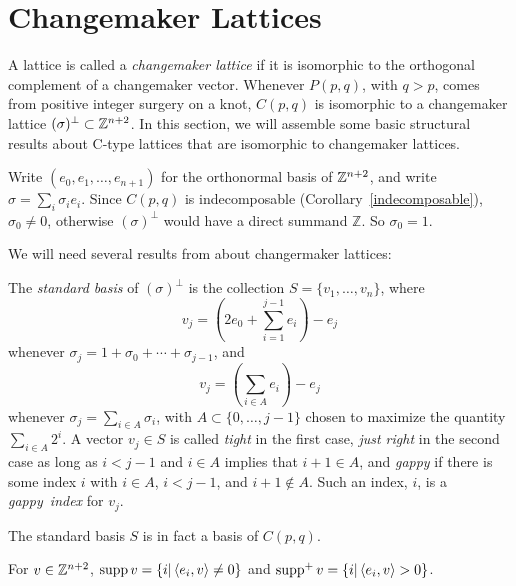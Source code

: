 \section{Changemaker Lattices}\label{sec:ChangemakerLattices}


A lattice is called a {\it changemaker lattice} if it is isomorphic to the orthogonal complement of a changemaker vector. Whenever $P(p, q)$, with $q>p$, comes from positive integer surgery on a knot, $C(p,q)$ is isomorphic to a changemaker lattice $(\sigma)^\perp\subset \mathbb{Z}^{n+2}$. 
In this section, we will assemble some basic structural results about C-type lattices that are isomorphic to changemaker lattices.

Write $(e_0,e_1, \dots, e_{n+1})$ for the orthonormal basis of $\mathbb{Z}^{n+2}$, and write $\sigma = \sum_i \sigma_i e_i$. 
Since $C(p,q)$ is indecomposable (Corollary~\ref{indecomposable}), $\sigma_0\ne0$, otherwise $(\sigma)^\perp$ would have a direct summand $\mathbb Z$. So $\sigma_0=1$.

We will need several results from \cite[Section~3]{greene:LSRP} about changermaker lattices:

\begin{definition}\label{stbasis}
The {\it standard basis} of $(\sigma)^\perp$ is the collection $S = \{v_1, \dots, v_{n}\}$, where
\begin{equation*}
    v_j = \left(2e_0 + \sum_{i = 1}^{j - 1} e_i\right) - e_j
\end{equation*}
whenever $\sigma_j = 1 + \sigma_0 + \cdots + \sigma_{j-1}$, and
\begin{equation*}
    v_j = \left(\sum_{i \in A} e_i\right) - e_j
\end{equation*}
whenever $\sigma_j = \sum_{i \in A} \sigma_i$, with $A \subset \{0, \dots, j-1\}$ chosen to maximize the quantity $\sum_{i \in A} 2^i$.  A vector $v_j \in S$ is called \emph{tight} in the first case, \emph{just right} in the second case as long as $i < j-1$ and $i \in A$ implies that $i+1\in A$, and \emph{gappy} if there is some index $i$ with $i \in A$, $i < j-1$, and $i+1 \not \in A$. Such an index, $i$, is a \emph{gappy~index} for $v_j$.
\end{definition}


The standard basis $S$ is in fact a basis of $C(p,q)$.

\begin{definition}
For $v \in \mathbb{Z}^{n+2}$, $\operatorname{supp} v = \{i | \left\langle e_i , v \right\rangle \neq 0\}$ and $\operatorname{supp}^+ v = \{i | \left\langle e_i , v \right\rangle > 0\}$.
\end{definition}

